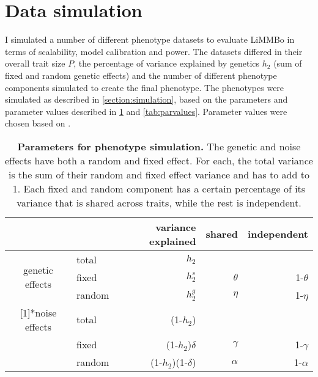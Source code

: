 \section{Data simulation}
\label{section:data-limmbo}
I simulated a number of different phenotype datasets to evaluate LiMMBo in terms of scalability, model calibration and power. The datasets differed in their overall trait size \(P\), the percentage of variance explained by genetics \(h_2\) (sum of fixed and random genetic effects) and the number of different phenotype components simulated to create the final phenotype. The phenotypes were simulated as described in \cref{section:simulation}, based on the parameters and parameter values described in \cref{tab:pardescription} and \cref{tab:parvalues}. Parameter values were chosen based on .

\begin{table}[htbp]
  \centering
  \caption[\textbf{Parameters for phenotype simulation.}]{\textbf{Parameters for phenotype simulation.} The genetic and noise effects have both a random and fixed effect. For each, the total variance is the sum of their random and fixed effect variance and has to add to 1. Each fixed and random component has a certain percentage of its variance that is shared across traits, while the rest is independent.}
    \begin{tabular}{clrrr}
    \toprule
          &       & variance explained & shared & independent \\
    \midrule
    \multirow{3}[1]{*}{genetic effects} & total & \(h_2\) &       &  \\
          & fixed & \(h_2^s\) & \(\theta\) & 1-\(\theta\) \\
          & random & \(h_2^g\) & \(\eta\) & 1-\(\eta\) \\
   \addlinespace[1.5ex]
    \multirow{3}[1]{*}{noise effects} & total & (1-\(h_2\)) &       &  \\
          & fixed & (1-\(h_2\))\(\delta\) & \(\gamma\) & 1-\(\gamma\) \\
          & random & (1-\(h_2\))(1-\(\delta\)) & \(\alpha\) & 1-\(\alpha\) \\
    \bottomrule
    \end{tabular}%
  \label{tab:pardescription}%
\end{table}%

